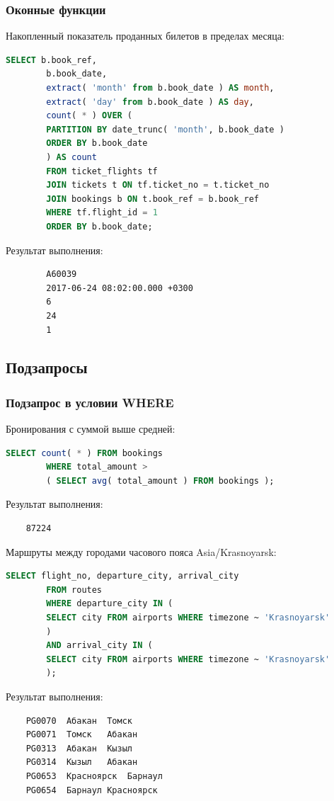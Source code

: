 \documentclass{bmstu-sob}
\begin{document}
	\subsubsection{Оконные функции}
	Накопленный показатель проданных билетов в пределах месяца:
	\begin{lstlisting}[language=SQL]
		SELECT b.book_ref,
		b.book_date,
		extract( 'month' from b.book_date ) AS month,
		extract( 'day' from b.book_date ) AS day,
		count( * ) OVER (
		PARTITION BY date_trunc( 'month', b.book_date )
		ORDER BY b.book_date
		) AS count
		FROM ticket_flights tf
		JOIN tickets t ON tf.ticket_no = t.ticket_no
		JOIN bookings b ON t.book_ref = b.book_ref
		WHERE tf.flight_id = 1
		ORDER BY b.book_date;
	\end{lstlisting}
	Результат выполнения:
	\begin{lstlisting}
		A60039
		2017-06-24 08:02:00.000 +0300
		6
		24
		1
	\end{lstlisting}
	
	\subsection{Подзапросы}
	
	\subsubsection{Подзапрос в условии WHERE}
	Бронирования с суммой выше средней:
	\begin{lstlisting}[language=SQL]
		SELECT count( * ) FROM bookings
		WHERE total_amount >
		( SELECT avg( total_amount ) FROM bookings );
	\end{lstlisting}
	Результат выполнения:
	\begin{lstlisting}
	87224
	\end{lstlisting}
	
	Маршруты между городами часового пояса Asia/Krasnoyarsk:
	\begin{lstlisting}[language=SQL]
		SELECT flight_no, departure_city, arrival_city
		FROM routes
		WHERE departure_city IN (
		SELECT city FROM airports WHERE timezone ~ 'Krasnoyarsk'
		)
		AND arrival_city IN (
		SELECT city FROM airports WHERE timezone ~ 'Krasnoyarsk'
		);
	\end{lstlisting}
	Результат выполнения:
	\begin{lstlisting}
	PG0070	Абакан	Томск
	PG0071	Томск	Абакан
	PG0313	Абакан	Кызыл
	PG0314	Кызыл	Абакан
	PG0653	Красноярск	Барнаул
	PG0654	Барнаул	Красноярск
	
	\end{lstlisting}
	
\end{document}
